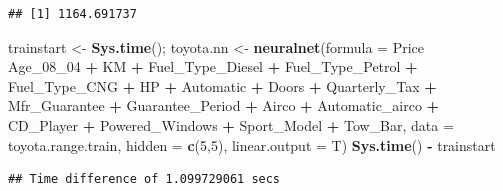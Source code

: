 \documentclass[]{article}
\newenvironment{Shaded}{\begin{snugshade}}{\end{snugshade}}
\newcommand{\KeywordTok}[1]{\textcolor[rgb]{0.13,0.29,0.53}{\textbf{#1}}}
\newcommand{\DataTypeTok}[1]{\textcolor[rgb]{0.13,0.29,0.53}{#1}}
\newcommand{\DecValTok}[1]{\textcolor[rgb]{0.00,0.00,0.81}{#1}}
\newcommand{\StringTok}[1]{\textcolor[rgb]{0.31,0.60,0.02}{#1}}
\newcommand{\CommentTok}[1]{\textcolor[rgb]{0.56,0.35,0.01}{\textit{#1}}}
\newcommand{\OperatorTok}[1]{\textcolor[rgb]{0.81,0.36,0.00}{\textbf{#1}}}
\newcommand{\NormalTok}[1]{#1}
\begin{document}
\begin{verbatim}
## [1] 1164.691737
\end{verbatim}

\begin{Shaded}
\begin{Highlighting}[]
\NormalTok{trainstart <-}\StringTok{ }\KeywordTok{Sys.time}\NormalTok{();}
\NormalTok{toyota.nn <-}\StringTok{ }\KeywordTok{neuralnet}\NormalTok{(}\DataTypeTok{formula =}\NormalTok{ Price }\OperatorTok{~}\StringTok{ }\NormalTok{Age_08_}\DecValTok{04} \OperatorTok{+}\StringTok{ }\NormalTok{KM }\OperatorTok{+}\StringTok{ }\NormalTok{Fuel_Type_Diesel }\OperatorTok{+}\StringTok{ }\NormalTok{Fuel_Type_Petrol }\OperatorTok{+}\StringTok{ }\NormalTok{Fuel_Type_CNG }\OperatorTok{+}\StringTok{ }\NormalTok{HP }\OperatorTok{+}\StringTok{ }\NormalTok{Automatic }\OperatorTok{+}\StringTok{ }\NormalTok{Doors }\OperatorTok{+}\StringTok{ }\NormalTok{Quarterly_Tax }\OperatorTok{+}\StringTok{ }\NormalTok{Mfr_Guarantee }\OperatorTok{+}\StringTok{ }\NormalTok{Guarantee_Period }\OperatorTok{+}\StringTok{ }\NormalTok{Airco }\OperatorTok{+}\StringTok{ }\NormalTok{Automatic_airco }\OperatorTok{+}\StringTok{ }\NormalTok{CD_Player }\OperatorTok{+}\StringTok{ }\NormalTok{Powered_Windows }\OperatorTok{+}\StringTok{ }\NormalTok{Sport_Model }\OperatorTok{+}\StringTok{ }\NormalTok{Tow_Bar, }\DataTypeTok{data =}\NormalTok{ toyota.range.train, }\DataTypeTok{hidden =} \KeywordTok{c}\NormalTok{(}\DecValTok{5}\NormalTok{,}\DecValTok{5}\NormalTok{), }\DataTypeTok{linear.output =}\NormalTok{ T)}
\KeywordTok{Sys.time}\NormalTok{() }\OperatorTok{-}\StringTok{ }\NormalTok{trainstart}
\end{Highlighting}
\end{Shaded}

\begin{verbatim}
## Time difference of 1.099729061 secs
\end{verbatim}

\begin{Shaded}
\end{Shaded}
\end{document}
